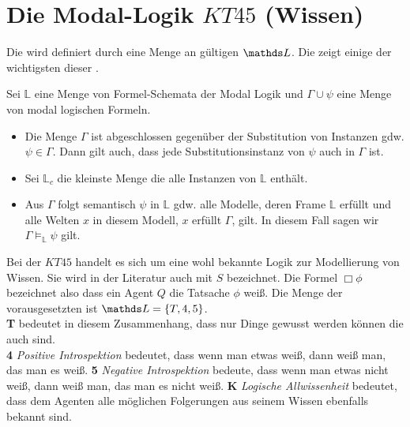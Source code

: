 

\section{Die Modal-Logik $KT45$ (Wissen)} %
\label{sub:the_normal_modal_logic_s5_}

Die \ML wird definiert durch eine Menge an gültigen \formelSchemata $\Menge{L}$.
Die  zeigt einige der wichtigsten dieser \formelSchemata.

\begin{definition}
	\label{def:substitution}
	Sei $\mathds{L}$ eine Menge von Formel-Schemata der Modal Logik und $\Gamma \cup {\psi}$ eine Menge von modal logischen Formeln.
	
	\begin{itemize}
		\item Die Menge $\Gamma$ ist abgeschlossen gegenüber der Substitution von Instanzen gdw.  $\psi \in \Gamma$. 
		Dann gilt auch, dass jede Substitutionsinstanz von $\psi$ auch in $\Gamma$ ist.
		\item Sei $\mathds{L}_c$ die kleinste Menge die alle Instanzen von $\mathds{L}$ enthält.
		\item Aus $\Gamma$ folgt semantisch $\psi$ in $\mathds{L}$ gdw. alle Modelle, deren Frame $\mathds{L}$ erfüllt und alle Welten $x$ in diesem Modell, $x$ erfüllt $\Gamma$, gilt.
		In diesem Fall sagen wir $\Gamma \vDash_{\mathds{L}} \psi$ gilt.
	\end{itemize}
	\cite[S.326]{huth2004logic}
\end{definition}

Bei der \ML $KT45$ handelt es sich um eine wohl bekannte Logik zur Modellierung von Wissen.
Sie wird in der Literatur auch mit $S$ bezeichnet.
Die Formel $\Box \phi$ bezeichnet also dass ein Agent $Q$ die Tatsache $\phi$ weiß.
Die Menge der vorausgesetzten \formelSchemata ist $\Menge{L} = \{T, 4, 5\}$.\\
\textbf{T} bedeutet in diesem Zusammenhang, dass nur Dinge gewusst werden können die auch \true sind.\\
\textbf{4} \emph{Positive Introspektion} bedeutet, dass wenn man etwas weiß, dann weiß man, das man es weiß.
\textbf{5} \emph{Negative Introspektion} bedeute, dass wenn man etwas nicht weiß, dann weiß man, das man es nicht weiß.
\textbf{K} \emph{Logische Allwissenheit} bedeutet, dass dem Agenten alle möglichen Folgerungen aus seinem Wissen ebenfalls bekannt sind.


